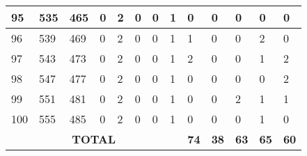 \begin{sidewaystable}[!h]
\begin{tabular}{|l|l|l|l|l|l|l|l|l|l|l|l|l|}
			95 & 535 & 465 & 0 & 2 & 0 & 0 & 1 & 0 & 0 & 0 & 0 & 0 \\ \hline
			96 & 539 & 469 & 0 & 2 & 0 & 0 & 1 & 1 & 0 & 0 & 2 & 0 \\ \hline
			97 & 543 & 473 & 0 & 2 & 0 & 0 & 1 & 2 & 0 & 0 & 1 & 2 \\ \hline
			98 & 547 & 477 & 0 & 2 & 0 & 0 & 1 & 0 & 0 & 0 & 0 & 2 \\ \hline
			99 & 551 & 481 & 0 & 2 & 0 & 0 & 1 & 0 & 0 & 2 & 1 & 1 \\ \hline
			100 & 555 & 485 & 0 & 2 & 0 & 0 & 1 & 0 & 0 & 0 & 1 & 0 \\ \hline
			\multicolumn{8}{|c|}{\textbf{TOTAL}} & \textbf{74} & \textbf{38} & \textbf{63} & \textbf{65} & \textbf{60} \\ \hline
		\end{tabular}
\end{sidewaystable}
\clearpage


